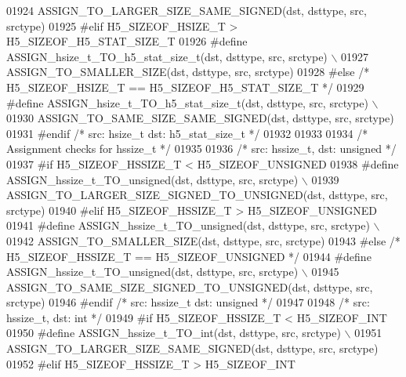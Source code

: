 \begin{DoxyCode}
01924 \textcolor{preprocessor}{        ASSIGN\_TO\_LARGER\_SIZE\_SAME\_SIGNED(dst, dsttype, src, srctype)}
01925 \textcolor{preprocessor}{#elif H5\_SIZEOF\_HSIZE\_T > H5\_SIZEOF\_H5\_STAT\_SIZE\_T}
01926 \textcolor{preprocessor}{    #define ASSIGN\_hsize\_t\_TO\_h5\_stat\_size\_t(dst, dsttype, src, srctype) \(\backslash\)}
01927 \textcolor{preprocessor}{        ASSIGN\_TO\_SMALLER\_SIZE(dst, dsttype, src, srctype)}
01928 \textcolor{preprocessor}{#else }\textcolor{comment}{/* H5\_SIZEOF\_HSIZE\_T == H5\_SIZEOF\_H5\_STAT\_SIZE\_T */}\textcolor{preprocessor}{}
01929 \textcolor{preprocessor}{    #define ASSIGN\_hsize\_t\_TO\_h5\_stat\_size\_t(dst, dsttype, src, srctype) \(\backslash\)}
01930 \textcolor{preprocessor}{        ASSIGN\_TO\_SAME\_SIZE\_SAME\_SIGNED(dst, dsttype, src, srctype)}
01931 \textcolor{preprocessor}{#endif }\textcolor{comment}{/* src: hsize\_t dst: h5\_stat\_size\_t */}\textcolor{preprocessor}{}
01932 
01933 
01934 \textcolor{comment}{/* Assignment checks for hssize\_t */}
01935 
01936 \textcolor{comment}{/* src: hssize\_t, dst: unsigned */}
01937 \textcolor{preprocessor}{#if H5\_SIZEOF\_HSSIZE\_T < H5\_SIZEOF\_UNSIGNED}
01938 \textcolor{preprocessor}{    #define ASSIGN\_hssize\_t\_TO\_unsigned(dst, dsttype, src, srctype) \(\backslash\)}
01939 \textcolor{preprocessor}{        ASSIGN\_TO\_LARGER\_SIZE\_SIGNED\_TO\_UNSIGNED(dst, dsttype, src, srctype)}
01940 \textcolor{preprocessor}{#elif H5\_SIZEOF\_HSSIZE\_T > H5\_SIZEOF\_UNSIGNED}
01941 \textcolor{preprocessor}{    #define ASSIGN\_hssize\_t\_TO\_unsigned(dst, dsttype, src, srctype) \(\backslash\)}
01942 \textcolor{preprocessor}{        ASSIGN\_TO\_SMALLER\_SIZE(dst, dsttype, src, srctype)}
01943 \textcolor{preprocessor}{#else }\textcolor{comment}{/* H5\_SIZEOF\_HSSIZE\_T == H5\_SIZEOF\_UNSIGNED */}\textcolor{preprocessor}{}
01944 \textcolor{preprocessor}{    #define ASSIGN\_hssize\_t\_TO\_unsigned(dst, dsttype, src, srctype) \(\backslash\)}
01945 \textcolor{preprocessor}{        ASSIGN\_TO\_SAME\_SIZE\_SIGNED\_TO\_UNSIGNED(dst, dsttype, src, srctype)}
01946 \textcolor{preprocessor}{#endif }\textcolor{comment}{/* src: hssize\_t dst: unsigned */}\textcolor{preprocessor}{}
01947 
01948 \textcolor{comment}{/* src: hssize\_t, dst: int */}
01949 \textcolor{preprocessor}{#if H5\_SIZEOF\_HSSIZE\_T < H5\_SIZEOF\_INT}
01950 \textcolor{preprocessor}{    #define ASSIGN\_hssize\_t\_TO\_int(dst, dsttype, src, srctype) \(\backslash\)}
01951 \textcolor{preprocessor}{        ASSIGN\_TO\_LARGER\_SIZE\_SAME\_SIGNED(dst, dsttype, src, srctype)}
01952 \textcolor{preprocessor}{#elif H5\_SIZEOF\_HSSIZE\_T > H5\_SIZEOF\_INT}

\end{DoxyCode}
